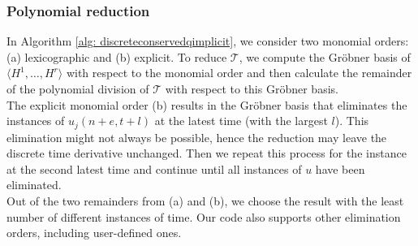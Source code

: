 \documentclass[sigconf,twocolumn]{acmart}
\newcommand{\1}{{\chi}}
\numberwithin{equation}{section}
\theoremstyle{thmlemcorr}
\numberwithin{theorem}{section}
\theoremstyle{thmlemcorr*}
\theoremstyle{defi}
\theoremstyle{remexample}
\theoremstyle{ass}
\begin{document}
	\subsubsection*{Polynomial reduction}
	In Algorithm \ref{alg: discreteconservedqimplicit}, we consider two monomial orders: (a) lexicographic and (b) explicit.
	To reduce $\mathcal{T}$, we compute the Gr{\"o}bner basis of $\langle H^1,\ldots,H^r\rangle$ with respect to the monomial order and then calculate the remainder of the polynomial division of $\mathcal{T}$ with respect to this Gr{\"o}bner basis.\\
	The explicit monomial order (b) results in the Gr{\"o}bner basis that eliminates the instances of $u_j(n+e,t+l)$ at the latest time (with the largest $l$). This elimination might not always be possible, hence the reduction may leave the discrete time derivative unchanged. Then we repeat this process for the instance at the second latest time and continue until all instances of $u$ have been eliminated.\\
	Out of the two remainders from (a) and (b), we choose the result with the least number of different instances of time. Our code also supports other elimination orders, including user-defined ones.
\end{document}
